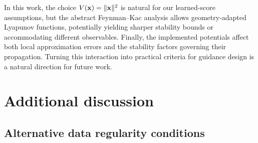 \documentclass[11pt]{article}
\theoremstyle{plain}
\theoremstyle{definition}
\theoremstyle{remark}
\begin{document}
In this work, the choice $V(\mathbf{x})=\|\mathbf{x}\|^2$ is natural for our learned-score assumptions, but the abstract Feynman--Kac analysis allows geometry-adapted Lyapunov functions, potentially yielding sharper stability bounds or accommodating different observables. Finally, the implemented potentials affect both local approximation errors and the stability factors governing their propagation. Turning this interaction into practical criteria for guidance design is a natural direction for future work.


\newpage


















\newpage


\appendix





\tableofcontents

\newpage

 \section{Additional discussion}

\subsection{Alternative data regularity conditions}
\label{app:data_regularity}
\end{document}
